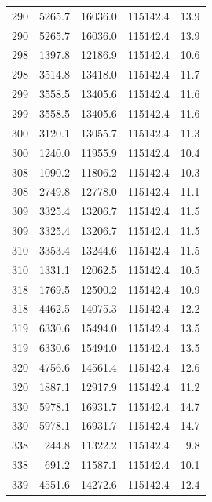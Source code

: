 \begin{longtable}{rrrrr}
    290 & \num{5265.7} & \num{16036.0} & \num{115142.4} & 13.9 \\
    290 & \num{5265.7} & \num{16036.0} & \num{115142.4} & 13.9 \\
    298 & \num{1397.8} & \num{12186.9} & \num{115142.4} & 10.6 \\
    298 & \num{3514.8} & \num{13418.0} & \num{115142.4} & 11.7 \\
    299 & \num{3558.5} & \num{13405.6} & \num{115142.4} & 11.6 \\
    299 & \num{3558.5} & \num{13405.6} & \num{115142.4} & 11.6 \\
    300 & \num{3120.1} & \num{13055.7} & \num{115142.4} & 11.3 \\
    300 & \num{1240.0} & \num{11955.9} & \num{115142.4} & 10.4 \\
    308 & \num{1090.2} & \num{11806.2} & \num{115142.4} & 10.3 \\
    308 & \num{2749.8} & \num{12778.0} & \num{115142.4} & 11.1 \\
    309 & \num{3325.4} & \num{13206.7} & \num{115142.4} & 11.5 \\
    309 & \num{3325.4} & \num{13206.7} & \num{115142.4} & 11.5 \\
    310 & \num{3353.4} & \num{13244.6} & \num{115142.4} & 11.5 \\
    310 & \num{1331.1} & \num{12062.5} & \num{115142.4} & 10.5 \\
    318 & \num{1769.5} & \num{12500.2} & \num{115142.4} & 10.9 \\
    318 & \num{4462.5} & \num{14075.3} & \num{115142.4} & 12.2 \\
    319 & \num{6330.6} & \num{15494.0} & \num{115142.4} & 13.5 \\
    319 & \num{6330.6} & \num{15494.0} & \num{115142.4} & 13.5 \\
    320 & \num{4756.6} & \num{14561.4} & \num{115142.4} & 12.6 \\
    320 & \num{1887.1} & \num{12917.9} & \num{115142.4} & 11.2 \\
    330 & \num{5978.1} & \num{16931.7} & \num{115142.4} & 14.7 \\
    330 & \num{5978.1} & \num{16931.7} & \num{115142.4} & 14.7 \\
    338 & \num{244.8} & \num{11322.2} & \num{115142.4} & 9.8 \\
    338 & \num{691.2} & \num{11587.1} & \num{115142.4} & 10.1 \\
    339 & \num{4551.6} & \num{14272.6} & \num{115142.4} & 12.4 \\

\end{longtable}
